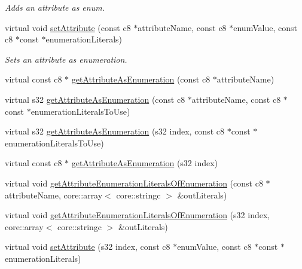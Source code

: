 \begin{DoxyCompactItemize}
\begin{DoxyCompactList}\small\item\em Adds an attribute as enum. \end{DoxyCompactList}\item 
\hypertarget{classirr_1_1io_1_1_c_attributes_af3a753227a64622c89637dd33c89f114}{virtual void \hyperlink{classirr_1_1io_1_1_c_attributes_af3a753227a64622c89637dd33c89f114}{set\-Attribute} (const c8 $\ast$attribute\-Name, const c8 $\ast$enum\-Value, const c8 $\ast$const $\ast$enumeration\-Literals)}\label{classirr_1_1io_1_1_c_attributes_af3a753227a64622c89637dd33c89f114}

\begin{DoxyCompactList}\small\item\em Sets an attribute as enumeration. \end{DoxyCompactList}\item 
virtual const c8 $\ast$ \hyperlink{classirr_1_1io_1_1_c_attributes_af774f822ac2d434bdd1decd7fd747a7e}{get\-Attribute\-As\-Enumeration} (const c8 $\ast$attribute\-Name)
\item 
virtual s32 \hyperlink{classirr_1_1io_1_1_c_attributes_ab21438063c56f62d3ebc598d361b231e}{get\-Attribute\-As\-Enumeration} (const c8 $\ast$attribute\-Name, const c8 $\ast$const $\ast$enumeration\-Literals\-To\-Use)
\item 
virtual s32 \hyperlink{classirr_1_1io_1_1_c_attributes_a16818ae4592f9d9716e1fa6b00ffea3a}{get\-Attribute\-As\-Enumeration} (s32 index, const c8 $\ast$const $\ast$enumeration\-Literals\-To\-Use)
\item 
virtual const c8 $\ast$ \hyperlink{classirr_1_1io_1_1_c_attributes_ae5abcddc4fede12071142c547c4fa524}{get\-Attribute\-As\-Enumeration} (s32 index)
\item 
virtual void \hyperlink{classirr_1_1io_1_1_c_attributes_a63ca36ed2f2e5d79244baabdad8b8684}{get\-Attribute\-Enumeration\-Literals\-Of\-Enumeration} (const c8 $\ast$attribute\-Name, core\-::array$<$ core\-::stringc $>$ \&out\-Literals)
\item 
virtual void \hyperlink{classirr_1_1io_1_1_c_attributes_aa81b0b8b31e8725f6d3c5021bd45ab7d}{get\-Attribute\-Enumeration\-Literals\-Of\-Enumeration} (s32 index, core\-::array$<$ core\-::stringc $>$ \&out\-Literals)
\item 
\hypertarget{classirr_1_1io_1_1_c_attributes_af067fbdcd90b9b8016899bac4aa99c3f}{virtual void \hyperlink{classirr_1_1io_1_1_c_attributes_af067fbdcd90b9b8016899bac4aa99c3f}{set\-Attribute} (s32 index, const c8 $\ast$enum\-Value, const c8 $\ast$const $\ast$enumeration\-Literals)}\label{classirr_1_1io_1_1_c_attributes_af067fbdcd90b9b8016899bac4aa99c3f}


\end{DoxyCompactItemize}
